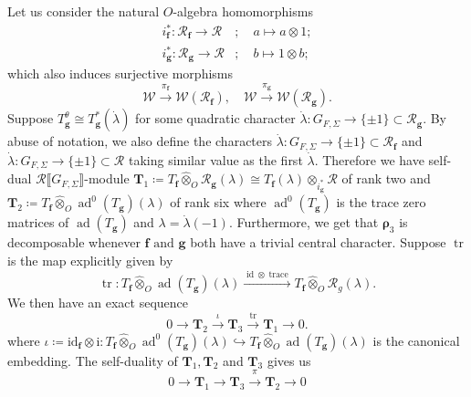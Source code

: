 \documentclass[10pt]{amsart}
\numberwithin{equation}{section}
\theoremstyle{definition}
\theoremstyle{remark} %
\newcommand{\bs}{\boldsymbol}
\newcommand{\ad}{\operatorname{ad}}
\DeclareMathOperator{\tr}{{tr}^*}
\newcommand{\f}{\mathbf{f}}
\newcommand{\g}{\mathbf{g}}
\newcommand{\R}{\mathcal{R}}
\newcommand{\T}{\mathbf{T}}
\newcommand{\W}{\mathcal{W}}
\begin{document}
	\subsubsection{}
	Let us consider the natural $ O $-algebra homomorphisms
	\begin{equation}
		\begin{split}
			i^*_\f : \R_\f \rightarrow \R  &; \quad a   \mapsto a \otimes 1; \\
			i^*_\g : \R_\g \rightarrow \R  &; \quad b   \mapsto 1 \otimes b;
		\end{split}
	\end{equation}
	which also induces surjective morphisms
	$$ \W \xrightarrow{\pi_\f} \W(\R_\f), \quad  \W \xrightarrow{\pi_\g} \W(\R_\g).  $$
	Suppose $ T_{\g}^\theta \cong T_{\g}^*(\dot{\lambda}) $ for some quadratic character $ \dot{\lambda} \colon G_{F,\Sigma} \rightarrow \{\pm1\} \subset \R_{\g} $. By abuse of notation, we also define the characters $ \dot{\lambda} \colon G_{F,\Sigma} \rightarrow \{\pm1\} \subset \R_{\f} $ and $ \dot{\lambda}\colon G_{F,\Sigma} \rightarrow \{\pm1\} \subset \R $ taking similar value as the first $ \dot{\lambda} $. Therefore we have self-dual $\R \llbracket G_{F, \Sigma}\rrbracket$-module $ \T_1 \coloneqq T_\f \widehat{\otimes}_O \R_\g(\lambda) \cong T_\f(\lambda) \otimes_{i_\g^*} \R  $ of rank two and $ \T_2 \coloneqq T_\f \widehat{\otimes}_{O} \ad^0(T_{\g})(\lambda) $ of rank six where $ \ad^0(T_{\g}) $ is the trace zero matrices of $ \ad(T_\g) $ and $ \lambda = \dot{\lambda}(-1) $. Furthermore, we get that	$ \bs{\rho}_3 $ is decomposable whenever $ \f \text{ and } \g  $ both have a trivial central character. Suppose $ \operatorname{tr} $ is the map explicitly given by 
	$$ \operatorname{tr} \colon T_\f \widehat{\otimes}_{O} \ad(T_{\g})(\lambda) \xrightarrow{\operatorname{id} \otimes \operatorname{trace}} T_\f \widehat{\otimes}_O \R_g(\lambda). $$ 
	We then have an exact sequence
	\begin{equation}
		\label{mainses}
		0 \rightarrow \T_2 \xrightarrow{ \iota} \T_3 \xrightarrow{ \operatorname{tr}} \T_1 \rightarrow 0.
	\end{equation}
	where $ \iota \coloneqq \operatorname{id_{\f} \otimes i} \colon  T_\f \widehat{\otimes}_{O} \ad^0(T_{\g})(\lambda) \hookrightarrow T_\f \widehat{\otimes}_{O} \ad(T_{\g})(\lambda)$ is the canonical embedding. The self-duality of $ \T_1, \T_2 $ and $ \T_3 $ gives us
	\begin{equation}
		\label{mainses_dual}
		0 \rightarrow \T_1 \xrightarrow{\tr} \T_3 \xrightarrow{\pi_{\tr}} \T_2 \rightarrow 0
	\end{equation}
\end{document}
